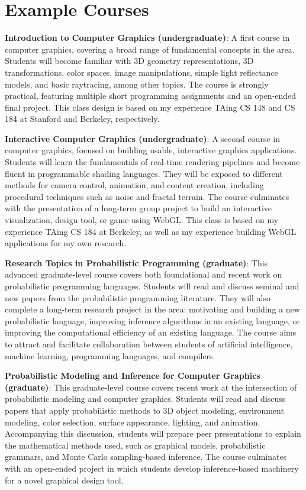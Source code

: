 \documentclass[
10pt, %
a4paper, %
oneside, %
headinclude,footinclude, %
BCOR5mm, %
]{scrartcl}
\begin{document}
\section*{Example Courses}

\textbf{Introduction to Computer Graphics (undergraduate)}:
A first course in computer graphics, covering a broad range of fundamental concepts in the area. Students will become familiar with 3D geometry representations, 3D transformations, color spaces, image manipulations, simple light reflectance models, and basic raytracing, among other topics. The course is strongly practical, featuring multiple short programming assignments and an open-ended final project. This class design is based on my experience TAing CS 148 and CS 184 at Stanford and Berkeley, respectively.

\textbf{Interactive Computer Graphics (undergraduate)}:
A second course in computer graphics, focused on building usable, interactive graphics applications. Students will learn the fundamentals of real-time rendering pipelines and become fluent in programmable shading languages. They will be exposed to different methods for camera control, animation, and content creation, including procedural techniques such as noise and fractal terrain. The course culminates with the presentation of a long-term group project to build an interactive visualization, design tool, or game using WebGL. This class is based on my experience TAing CS 184 at Berkeley, as well as my experience building WebGL applications for my own research.

\textbf{Research Topics in Probabilistic Programming (graduate)}:
This advanced graduate-level course covers both foundational and recent work on probabilistic programming languages. Students will read and discuss seminal and new papers from the probabilistic programming literature. They will also complete a long-term research project in the area: motivating and building a new probabilistic language, improving inference algorithms in an existing language, or improving the computational efficiency of an existing language. The course aims to attract and facilitate collaboration between students of artificial intelligence, machine learning, programming languages, and compilers.

\textbf{Probabilistic Modeling and Inference for Computer Graphics (graduate)}:
This graduate-level course covers recent work at the intersection of probabilistic modeling and computer graphics. Students will read and discuss papers that apply probabilistic methods to 3D object modeling, environment modeling, color selection, surface appearance, lighting, and animation. Accompanying this discussion, students will prepare peer presentations to explain the mathematical methods used, such as graphical models, probabilistic grammars, and Monte Carlo sampling-based inference. The course culminates with an open-ended project in which students develop inference-based machinery for a novel graphical design tool.
\end{document}
